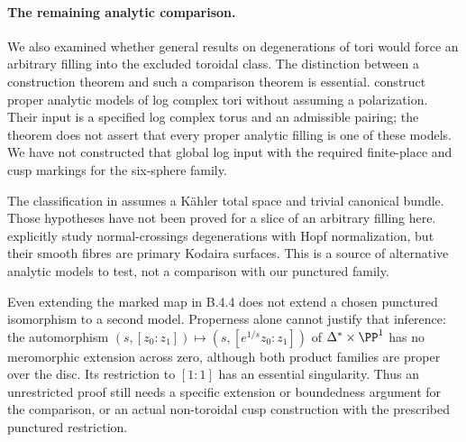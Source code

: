\paragraph{The remaining analytic comparison.}
We also examined whether general results on degenerations of tori
would force an arbitrary filling into the excluded toroidal class.
The distinction between a construction theorem and such a comparison
theorem is essential. \citet[Theorem 5.1.3 and Sections 5.2--5.4]
{KKN2008Root} construct proper analytic models of log complex tori
without assuming a polarization. Their input is a specified log
complex torus and an admissible pairing; the theorem does not assert
that every proper analytic filling is one of these models. We have
not constructed that global log input with the required finite-place
and cusp markings for the six-sphere family.

The classification in \citet[Theorem 3.1]{KamenovaToriRoot} assumes
a K\"ahler total space and trivial canonical bundle. Those hypotheses
have not been proved for a slice of an arbitrary filling here.
\citet[Section 3, Proposition 3.1]{SchroeerSiebert2002Root} explicitly
study normal-crossings degenerations with Hopf normalization, but
their smooth fibres are primary Kodaira surfaces. This is a source
of alternative analytic models to test, not a comparison with our
punctured family.

Even extending the marked map in B.4.4 does not extend a chosen
punctured isomorphism to a second model. Properness alone cannot
justify that inference: the automorphism
$(s,[z_0:z_1])\mapsto(s,[e^{1/s}z_0:z_1])$ of
$\Delta^*\times\PP^1$ has no meromorphic extension across zero,
although both product families are proper over the disc. Its
restriction to $[1:1]$ has an essential singularity. Thus an
unrestricted proof still needs a specific extension or boundedness
argument for the comparison, or an actual non-toroidal cusp
construction with the prescribed punctured restriction.
